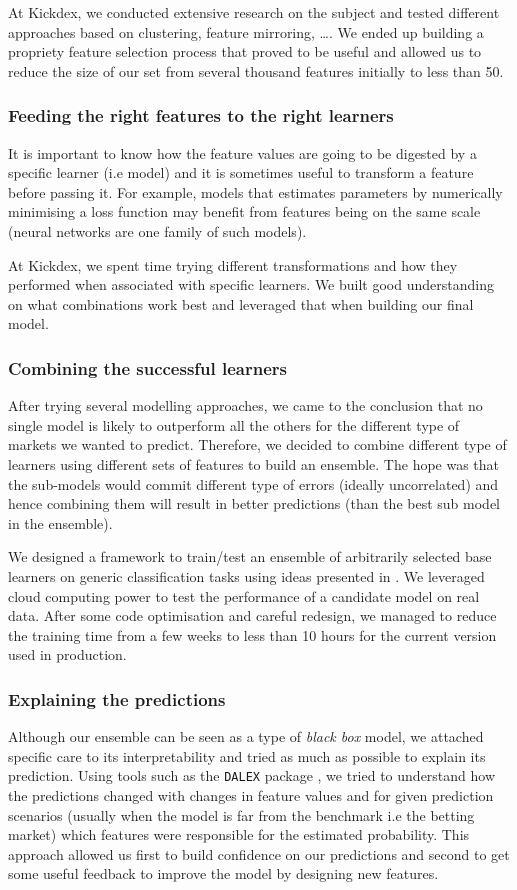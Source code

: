 \documentclass[11pt]{article}
\begin{document}
At Kickdex, we conducted extensive research on the subject and tested
different approaches based on clustering, feature mirroring, \ldots{}. We ended
up building a propriety feature selection process that proved to be useful
and allowed us to reduce the size of our set from several thousand features
initially to less than 50.
\subsubsection{Feeding the right features to the right learners}
\label{sec:org8adf2c8}
It is important to know how the feature values are going to be digested by a
specific learner (i.e model) and it is sometimes useful to transform a
feature before passing it. For example, models that estimates parameters by
numerically minimising a loss function may benefit from features being on
the same scale (neural networks are one family of such models).

At Kickdex, we spent time trying different transformations and how they
performed when associated with specific learners. We built good
understanding on what combinations work best and leveraged that when
building our final model.

\subsubsection{Combining the successful learners}
\label{sec:org75e5aa6}
After trying several modelling approaches, we came to the conclusion that no
single model is likely to outperform all the others for the different type
of markets we wanted to predict. Therefore, we decided to combine different
type of learners using different sets of features to build an ensemble. The
hope was that the sub-models would commit different type of errors (ideally
uncorrelated) and hence combining them will result in better predictions
(than the best sub model in the ensemble).

We designed a framework to train/test an ensemble of arbitrarily selected
base learners on generic classification tasks using ideas presented in
\cite{caruana04_ensem}. We leveraged cloud computing power to test the
performance of a candidate model on real data. After some code optimisation
and careful redesign, we managed to reduce the training time from a few
weeks to less than 10 hours for the current version used in production.
\subsubsection{Explaining the predictions}
\label{sec:orgfaf0f34}
Although our ensemble can be seen as a type of \emph{black box} model, we
attached specific care to its interpretability and tried as much as possible
to explain its prediction. Using tools such as the \texttt{DALEX} package
\cite{dalex2018}, we tried to understand how the predictions changed with
changes in feature values and for given prediction scenarios (usually when
the model is far from the benchmark i.e the betting market) which features
were responsible for the estimated probability. This approach allowed us
first to build confidence on our predictions and second to get some useful
feedback to improve the model by designing new features.
\end{document}
